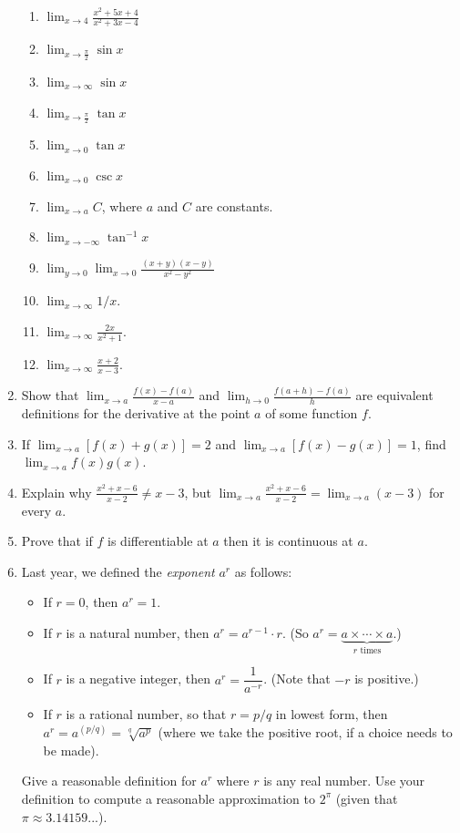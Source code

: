 \begin{enumerate}
\begin{multicols}{2}
\begin{enumerate}
      \item $ \lim_{x \to 4} \frac{x^2 + 5x + 4}{x^2 + 3x - 4} $
      \item $ \lim_{x \to \frac{\pi}{2}} \sin x $
      \item $ \lim_{x \to \infty} \sin x $
      \item $ \lim_{x \to \frac{\pi}{2}} \tan x $
      \item $ \lim_{x \to 0} \tan x $
      \item $ \lim_{x \to 0} \csc x $
      \item $ \lim_{x \to a} C $, where $ a $ and $ C $ are constants.
      \item $ \lim_{x \to -\infty} \tan^{-1} x $
      \item $ \lim_{y \to 0} \lim_{x \to 0} \frac{(x + y)(x - y)}{x^2 - y^2} $
      \item $ \lim_{x \to \infty} 1/x $.
      \item $ \lim_{x \to \infty} \frac{2x}{x^2 + 1} $.
      \item $ \lim_{x \to \infty} \frac{x + 2}{x - 3} $.
    \end{enumerate}
    \end{multicols}
  \item Show that $ \lim_{x \to a} \frac{f(x) - f(a)}{x - a} $ and $ \lim_{h \to 0} \frac{f(a + h) - f(a)}{h} $ are
        equivalent definitions for the derivative at the point $ a $ of some function $ f $.
  \item If $ \lim_{x \to a} [f(x) + g(x)] = 2 $ and $ \lim_{x \to a} [f(x) - g(x)] = 1 $, find $ \lim_{x \to a} f(x)g(x) $.
  \item Explain why $ \frac{x^2 + x - 6}{x - 2} \neq x - 3 $, but $ \lim_{x \to a} \frac{x^2 + x - 6}{x - 2} = \lim_{x \to a} (x - 3) $  for every $ a $.
  \item Prove that if $ f $ is differentiable at $ a $ then it is continuous at $ a $.
  \item Last year, we defined the \emph{exponent} $ a^r $ as follows:
        \begin{itemize}
          \item If $ r = 0 $, then $ a^r = 1 $.
          \item If $ r $ is a natural number, then $ a^r = a^{r - 1} \cdot r $. (So $ a^r =\underbrace{a \times \cdots \times a}_{r \text{ times}} $.)
          \item If $ r $ is a negative integer, then $ a^r = \dfrac{1}{a^{-r}} $. (Note that $ -r $ is positive.)
          \item If $ r $ is a rational number, so that $ r = p/q $ in lowest form, then $ a^r = a^{(p/q)} = \sqrt[q]{a^p} $ (where we take the positive root,
                    if a choice needs to be made).
        \end{itemize}
        Give a reasonable definition for $ a^r $ where $ r $ is any real number. Use your definition to compute a reasonable approximation to $ 2^\pi $
        (given that $ \pi \approx 3.14159...$).
\end{enumerate}


